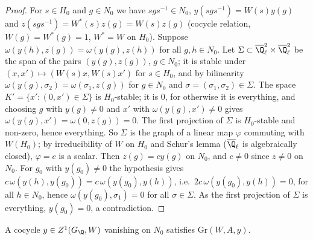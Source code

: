 \begin{proof}
For $s\in H_0$ and $g\in N_0$ we have $sgs^{-1}\in N_0$, $y(sgs^{-1})=W(s)y(g)$ and $z(sgs^{-1})=W^*(s)z(g)=W(s)z(g)$
(cocycle relation, $W(g)=W^*(g)=1$, $W^*=W$ on $H_0$). Suppose $\omega(y(h),z(g))=\omega(y(g),z(h))$ for all $g,h\in N_0$. Let
$\Sigma\subset\katoQlb^2\times\katoQlb^2$ be the span of the pairs $(y(g),z(g))$, $g\in N_0$; it is stable under
$(x,x')\mapsto(W(s)x,W(s)x')$ for $s\in H_0$, and by bilinearity $\omega(y(g),\sigma_2)=\omega(\sigma_1,z(g))$ for $g\in N_0$ and
$\sigma=(\sigma_1,\sigma_2)\in\Sigma$. The space $K'=\{x':(0,x')\in\Sigma\}$ is $H_0$-stable; it is $0$, for otherwise it is everything,
and choosing $g$ with $y(g)\ne0$ and $x'$ with $\omega(y(g),x')\ne0$ gives $\omega(y(g),x')=\omega(0,z(g))=0$. The first projection
of $\Sigma$ is $H_0$-stable and non-zero, hence everything. So $\Sigma$ is the graph of a linear map $\varphi$ commuting with
$W(H_0)$; by irreducibility of $W$ on $H_0$ and Schur's lemma ($\katoQlb$ is algebraically closed), $\varphi=c$ is a scalar.
Then $z(g)=cy(g)$ on $N_0$, and $c\ne0$ since $z\ne0$ on $N_0$. For $g_0$ with $y(g_0)\ne0$ the hypothesis gives
$c\,\omega(y(h),y(g_0))=c\,\omega(y(g_0),y(h))$, i.e.\ $2c\,\omega(y(g_0),y(h))=0$, for all $h\in N_0$, hence
$\omega(y(g_0),\sigma_1)=0$ for all $\sigma\in\Sigma$. As the first projection of $\Sigma$ is everything, $y(g_0)=0$, a contradiction.
\end{proof}

\begin{lemma}\label{pf:kato:grkill}
A cocycle $y\in\katoZ(G_\Q,W)$ vanishing on $N_0$ satisfies $\mathrm{Gr}(W,A,y)$.
\end{lemma}


